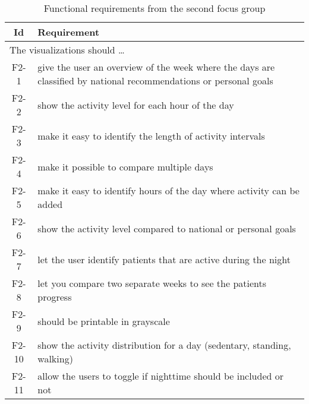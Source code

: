 \begin{table}[h!]
  \begin{center}
  \begin{tabular}{|c|p{12cm}|}
    \hline
      \textbf{Id} & \textbf{Requirement} \\ \hline
    \multicolumn{2}{|l|}{The visualizations should \ldots} \\ \hline
      F2-1 & give the user an overview of the week where the days are classified by national recommendations or personal goals \\ \hline
      F2-2 & show the activity level for each hour of the day \\ \hline
      F2-3 & make it easy to identify the length of activity intervals \\ \hline
      F2-4 & make it possible to compare multiple days \\ \hline
      F2-5 & make it easy to identify hours of the day where activity can be added \\ \hline
      F2-6 & show the activity level compared to national or personal goals \\ \hline
      F2-7 & let the user identify patients that are active during the night \\ \hline
      F2-8 & let you compare two separate weeks to see the patients progress \\ \hline
      F2-9 & should be printable in grayscale \\ \hline
      F2-10 & show the activity distribution for a day (sedentary, standing, walking) \\ \hline
      F2-11 & allow the users to toggle if nighttime should be included or not \\ \hline
  \end{tabular}
  \end{center}
  \caption{Functional requirements from the second focus group}
  \label{tab:f2Req}
\end{table}


